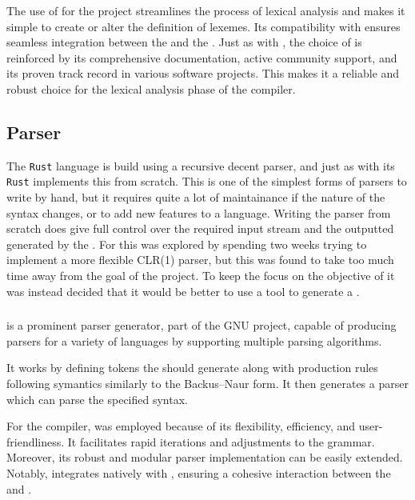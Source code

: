 The use of \lexerGen{} for the \lang{} project streamlines the process of lexical
analysis and makes it simple to create or alter the definition of lexemes. Its
compatibility with \parserGen{} ensures seamless integration between the \lexer{} and
the \parser. Just as with \parserGen, the choice of \lexerGen{} is reinforced by its
comprehensive documentation, active community support, and its proven track record in
various software projects. This makes it a reliable and robust choice for the lexical
analysis phase of the \lang{} compiler.

\subsection{Parser}
\label{sec:techParser}

The \texttt{Rust} language is build using a recursive decent parser, and just as with its
\lexer{} \texttt{Rust} implements this from scratch\cite{RUST-COMPILER-SRC}. This is one of
the simplest forms of parsers to write by hand, but it requires quite a lot of
maintainance if the nature of the syntax changes, or to add new features to a
language. Writing the parser from scratch does give full control over the required
input stream
and the outputted \ast{} generated by the \parser{}. For \lang{} this was explored
by spending two weeks trying to implement a more flexible CLR(1) parser, but this was
found to take too much time away from the goal of the project. To keep the focus on the
objective of \lang{} it was instead decided that it would be better to use a tool to
generate a \parser{}.

\subsubsection{\parserGen{}}
\label{sec:bison}

\parserGen{} is a prominent parser generator, part of the GNU project, capable of
producing parsers for a variety of languages by supporting multiple parsing
algorithms\cite{BISON}. 

It works by defining tokens the \lexer{} should generate along with production rules
following symantics similarly to the Backus–Naur form\cite{BNF}. It then generates a
parser which can parse the specified syntax.

For the \lang{} compiler, \parserGen{} was employed because of its flexibility,
efficiency, and user-friendliness. It facilitates rapid iterations and adjustments to
the grammar. Moreover, its robust and modular parser implementation can be easily
extended. Notably, \parserGen{} integrates natively with \lexerGen{}, ensuring a
cohesive interaction between the \lexer{} and \parser{}.

